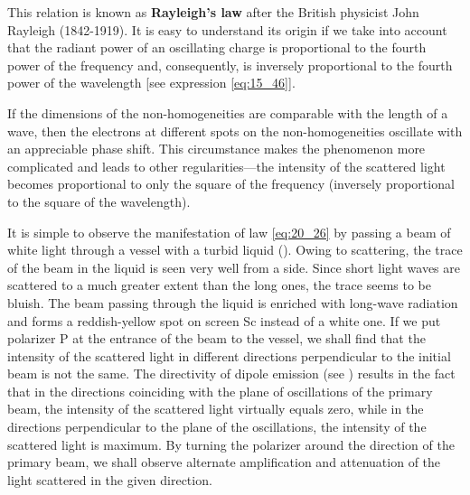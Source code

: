 \noindent
This relation is known as \textbf{Rayleigh's law} after the British physicist John Rayleigh (1842-1919).
It is easy to understand its origin if we take into account that the radiant power of an oscillating charge is proportional to the fourth power of the frequency and, consequently, is inversely proportional to the fourth power of the wavelength [see expression \eqref{eq:15_46}].

If the dimensions of the non-homogeneities are comparable with the length of a wave, then the electrons at different spots on the non-homogeneities oscillate with an appreciable phase shift.
This circumstance makes the phenomenon more complicated and leads to other regularities---the intensity of the scattered light becomes proportional to only the square of the frequency (inversely proportional to the square of the wavelength).

It is simple to observe the manifestation of law \eqref{eq:20_26} by passing a beam of white light through a vessel with a turbid liquid ().
Owing to scattering, the trace of the beam in the liquid is seen very well from a side.
Since short light waves are scattered to a much greater extent than the long ones, the trace seems to be bluish.
The beam passing through the liquid is enriched with long-wave radiation and forms a reddish-yellow spot on screen Sc instead of a white one.
If we put polarizer P at the entrance of the beam to the vessel, we shall find that the intensity of the scattered light in different directions perpendicular to the initial beam is not the same.
The directivity of dipole emission (see ) results in the fact that in the directions coinciding with the plane of oscillations of the primary beam, the intensity of the scattered light virtually equals zero, while in the directions perpendicular to the plane of the oscillations, the intensity of the scattered light is maximum.
By turning the polarizer around the direction of the primary beam, we shall observe alternate amplification and attenuation of the light scattered in the given direction.

